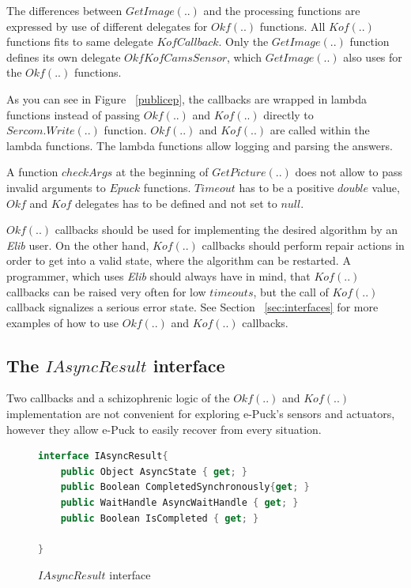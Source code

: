 \documentclass[12pt,notitlepage]{report}
\begin{document}
	The differences between $GetImage(..)$ and the processing functions are expressed by use of different
	delegates for $Okf(..)$ functions. All $Kof(..)$ functions fits to same delegate $KofCallback$. 
	Only the $GetImage(..)$ function defines its own delegate $OkfKofCamsSensor$, 
	which $GetImage(..)$ also uses for the $Okf(..)$ functions.

	As you can see in Figure ~\ref{publicep}, the callbacks are wrapped in lambda functions \cite{lambda}
	instead of passing $Okf(..)$ and $Kof(..)$ directly to $Sercom.Write(..)$ function.
	$Okf(..)$ and $Kof(..)$  are called within the lambda functions.
	The lambda functions allow logging and parsing the answers.

	A function $checkArgs$ at the beginning of $GetPicture(..)$ does not allow to pass invalid arguments
	to $Epuck$ functions. $Timeout$ has to be a positive $double$ value, $Okf$ and $Kof$ delegates 
	has to be defined and not set to $null$.

	$Okf(..)$ callbacks should be used for implementing the desired algorithm by an {\it Elib} user.
	On the other hand, $Kof(..)$ callbacks should perform repair actions in order to get into a valid state,
	where the algorithm can be restarted. A programmer, which uses {\it Elib} should always have in mind,
	that $Kof(..)$ callbacks can be raised very often for low $timeouts$,
	but the call of $Kof(..)$ callback signalizes a serious error state.
	See Section ~\ref{sec:interfaces} for more examples of how to use $Okf(..)$ and $Kof(..)$ callbacks.


\subsection{The $IAsyncResult$ interface} \label{sec:iasync}
	Two callbacks and a schizophrenic logic of the $Okf(..)$ and $Kof(..)$ implementation are not
	convenient for exploring e-Puck's sensors and actuators, 
	however they allow e-Puck to easily recover from every situation.

\begin{figure}[!hbp]
\begin{lstlisting}[language=cs]
interface IAsyncResult{
	public Object AsyncState { get; }
	public Boolean CompletedSynchronously{get; } 
	public WaitHandle AsyncWaitHandle { get; }
	public Boolean IsCompleted { get; }
	
}
\end{lstlisting}
\caption{$IAsyncResult$ interface}
\label{interface}
\end{figure}
\end{document}
